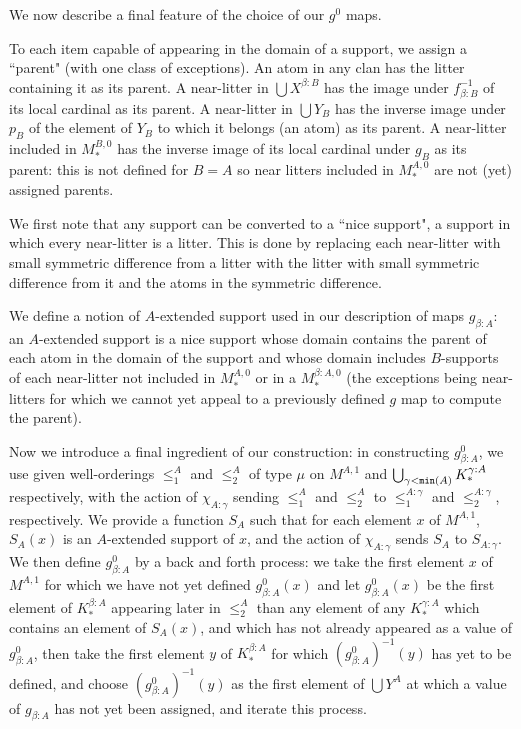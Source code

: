 \documentclass[12pt]{article}
\begin{document}
We now describe a final feature of the choice of our $g^0$ maps.   

To each item capable of appearing in the domain of a support, we assign a ``parent" (with one class of exceptions).
An atom in any clan has the litter containing it as its parent.  A near-litter  in $\bigcup X^{\beta:B}$ has the image under $f_{\beta:B}^{-1}$ of its local cardinal as its parent.
A near-litter in $\bigcup Y_B$ has the  inverse image under $p_B$ of the element of $Y_B$ to which it belongs  (an atom) as its parent.  A near-litter included in $M_*^{B,0}$ has the inverse image of its local cardinal under
$g_B$ as its parent:  this is not defined for $B=A$ so near litters included in $M_*^{A,0}$ are not (yet) assigned parents.

We first note that any support can be converted to a ``nice support", a support in which every near-litter is a litter.  This is done by replacing each
near-litter with small symmetric difference from a litter with the litter with small symmetric difference from it and the atoms in the symmetric difference.

We define a notion of $A$-extended support used in our description of maps $g_{\beta:A}$:   an $A$-extended support is a nice support whose domain contains the parent of
each atom in the domain of the support and whose domain includes $B$-supports of each near-litter not included in $M_*^{A,0}$ or in a $M_*^{\beta:A,0}$ (the exceptions being
near-litters for which we cannot yet appeal to a previously defined $g$ map to compute the parent).

Now we introduce a final ingredient of our construction:  in constructing $g^0_{\beta:A}$, we use given well-orderings $\leq^A_1$ and $\leq^A_2$ of type $\mu$ on $M^{A,1}$ and $\bigcup _{\gamma<{\tt min}(A)}K^{\gamma:A}_*$ respectively, with the action of $\chi_{A:\gamma}$ sending $\leq^A_1$ and $\leq^A_2$ to $\leq^{A:\gamma}_1$ and $\leq^{A:\gamma}_2$, respectively.  We provide
a function $S_A$ such that for each element $x$  of $M^{A,1}$, $S_A(x)$ is an $A$-extended support of $x$, and the action of $\chi_{A:\gamma}$ sends $S_A$ to $S_{A:\gamma}$.
We then define $g^0_{\beta:A}$ by a back and forth process:  we take the first element $x$ of $M^{A,1}$ for which we have not yet defined $g^0_{\beta:A}(x)$ and let $g^0_{\beta:A}(x)$
be the first element of  $K^{\beta:A}_*$  appearing later in $\leq^A_2$ than any element of any $K^{\gamma:A}_*$ which contains an element of  $S_A(x)$, and which has not already appeared as a value of $g^0_{\beta:A}$, then take the first element $y$ of  $K^{\beta:A}_*$ for which $(g^0_{\beta:A})^{-1}(y)$ has yet to be defined, and choose $(g^0_{\beta:A})^{-1}(y)$ as the first element of $\bigcup Y^{A}$ at which a value of $g_{\beta:A}$ has not yet been assigned, and iterate this process.
\end{document}
